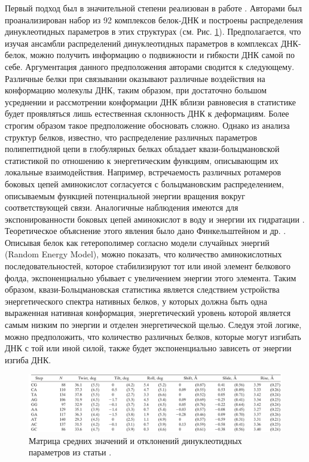 Первый подход был в значительной степени реализован в работе \cite{olson_dna_1998}. Авторами был проанализирован набор из 92 комплексов белок-ДНК и построены распределения динуклеотидных параметров в этих структурах (см. Рис. \ref{fig:p1:olson_DNA_param}). Предполагается, что изучая ансамбли распределений динуклеотидных параметров в комплексах ДНК-белок, можно получить информацию о подвижности и гибкости ДНК самой по себе. Аргументация данного предположения авторами сводится к следующему. Различные белки при связывании оказывают различные воздействия на  конформацию молекулы ДНК, таким образом, при достаточно большом усреднении и рассмотрении конформации ДНК вблизи равновесия в статистике будет проявляться лишь естественная склонность ДНК к деформациям.
Более строгим образом такое предположение обосновать сложно. Однако из анализа структур белков, известно, что распределение различных параметров полипептидной цепи в глобулярных белках обладает квази-больцмановской статистикой по отношению к энергетическим функциям, описывающим их локальные взаимодействия. Например, встречаемость различных ротамеров боковых цепей аминокислот согласуется с больцмановским распределением, описываемым функцией потенциальной энергии вращения вокруг соответствующей связи. Аналогичные наблюдения имеются для экспонированности боковых цепей аминокислот в воду и энергии их гидратации \cite{shaytan_solvent_2009}. Теоретическое объяснение этого явления было дано Финкельштейном и др. \cite{finkelstein_why_1995}. Описывая белок как гетерополимер согласно модели случайных энергий (Random Energy Model), можно показать, что количество аминокислотных последовательностей, которое стабилизируют тот или иной элемент белкового фолда, экспоненциально убывает с увеличением энергии этого элемента. Таким образом, квази-Больцмановская статистика является следствием устройства энергетического спектра нативных белков, у которых должна быть одна выраженная нативная конформация, энергетический уровень которой является самым низким по энергии и отделен энергетической щелью. Следуя этой логике, можно предположить, что количество различных белков, которые могут изгибать ДНК с той или иной силой, также будет экспоненциально зависеть от энергии изгиба ДНК.
\begin{figure}[H] 
  \center
  \includegraphics [width=\textwidth] {images/p1/olson_DNA_param}
  \caption{Матрица средних значений и отклонений динуклеотидных параметров из статьи \cite{olson_dna_1998}.} 
  \label{fig:p1:olson_DNA_param}
\end{figure}

